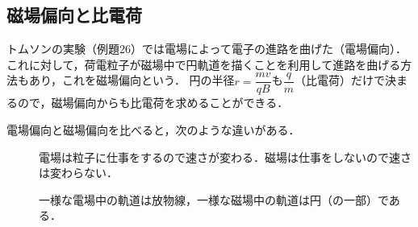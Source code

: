 \subsection{磁場偏向と比電荷}

トムソンの実験（例題26）では電場によって電子の進路を曲げた（電場偏向）．
これに対して，荷電粒子が磁場中で円軌道を描くことを利用して進路を曲げる方法もあり，これを{\gtfamily 磁場偏向}という．
円の半径$r=\dfrac{mv}{qB}$も$\dfrac{q}{m}$（比電荷）だけで決まるので，磁場偏向からも比電荷を求めることができる．

電場偏向と磁場偏向を比べると，次のような違いがある．
\begin{description}
\item[] 電場は粒子に仕事をするので{\gtfamily 速さが変わる}．磁場は仕事をしないので{\gtfamily 速さは変わらない}．
\item[] 一様な電場中の軌道は{\gtfamily 放物線}，一様な磁場中の軌道は{\gtfamily 円（の一部）}である．
\end{description}

